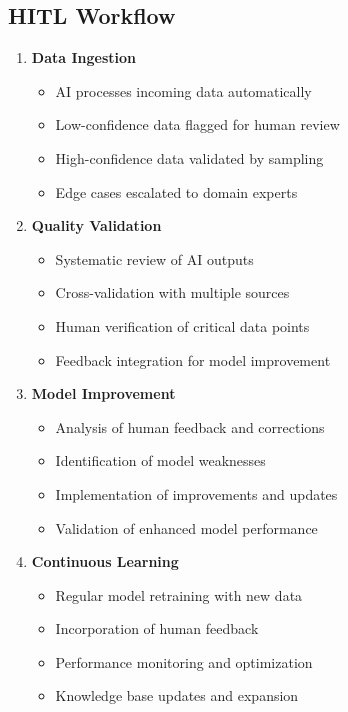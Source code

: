 \documentclass[business]{../templates/infraradar-main}
\begin{document}
\subsection{HITL Workflow}
\begin{enumerate}
    \item \textbf{Data Ingestion}
    \begin{itemize}
        \item AI processes incoming data automatically
        \item Low-confidence data flagged for human review
        \item High-confidence data validated by sampling
        \item Edge cases escalated to domain experts
    \end{itemize}
    
    \item \textbf{Quality Validation}
    \begin{itemize}
        \item Systematic review of AI outputs
        \item Cross-validation with multiple sources
        \item Human verification of critical data points
        \item Feedback integration for model improvement
    \end{itemize}
    
    \item \textbf{Model Improvement}
    \begin{itemize}
        \item Analysis of human feedback and corrections
        \item Identification of model weaknesses
        \item Implementation of improvements and updates
        \item Validation of enhanced model performance
    \end{itemize}
    
    \item \textbf{Continuous Learning}
    \begin{itemize}
        \item Regular model retraining with new data
        \item Incorporation of human feedback
        \item Performance monitoring and optimization
        \item Knowledge base updates and expansion
    \end{itemize}
\end{enumerate}
\end{document}
